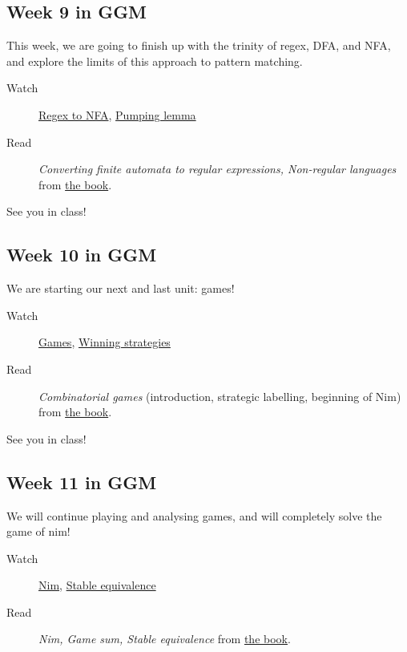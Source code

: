 \documentclass{amsart}
\begin{document}
\subsection{Week 9 in GGM}
\label{sec:orge269f49}
This week, we are going to finish up with the trinity of regex, DFA, and NFA, and explore the limits of this approach to pattern matching. 

\begin{description}
\item[{Watch}] \href{https://canvas.anu.edu.au/files/842902/}{Regex to NFA}, \href{https://canvas.anu.edu.au/files/842904/}{Pumping lemma}
\item[{Read}] \emph{Converting finite automata to regular expressions, Non-regular languages} from \href{https://canvas.anu.edu.au/files/715877/}{the book}.
\end{description}

See you in class!
\subsection{Week 10 in GGM}
\label{sec:org81271d9}
We are starting our next and last unit: games!

\begin{description}
\item[{Watch}] \href{https://canvas.anu.edu.au/files/857795/}{Games}, \href{https://canvas.anu.edu.au/files/857804/}{Winning strategies}
\item[{Read}] \emph{Combinatorial games} (introduction, strategic labelling, beginning of Nim) from \href{https://canvas.anu.edu.au/files/715877/}{the book}.
\end{description}

See you in class!
\subsection{Week 11 in GGM}
\label{sec:orgc1868aa}
We will continue playing and analysing games, and will completely solve the game of nim!

\begin{description}
\item[{Watch}] \href{https://canvas.anu.edu.au/files/1192864/}{Nim}, \href{https://canvas.anu.edu.au/files/1192874/}{Stable equivalence}
\item[{Read}] \emph{Nim, Game sum, Stable equivalence} from \href{https://canvas.anu.edu.au/files/715877/}{the book}.
\end{description}
\end{document}
